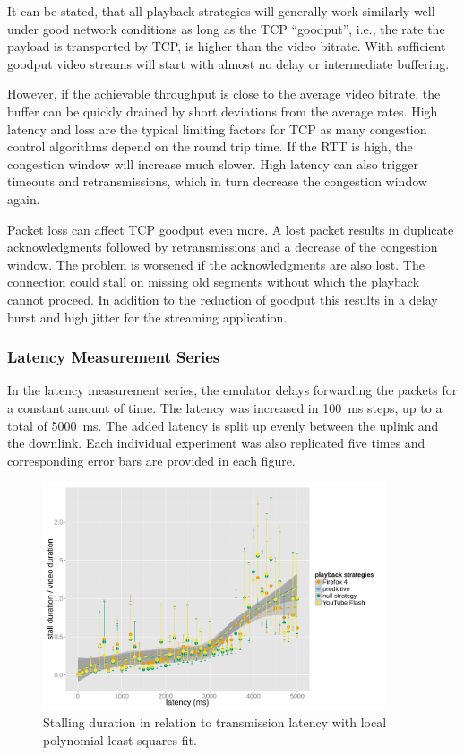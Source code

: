It can be stated, that all playback strategies will generally work similarly well under good network conditions as long as the \gls{TCP} ``goodput'', i.e., the rate the payload is transported by \gls{TCP}, is higher than the video bitrate. With sufficient goodput video streams will start with almost no delay or intermediate buffering. 

However, if the achievable throughput is close to the average video bitrate, the buffer can be quickly drained by short deviations from the average rates. High latency and loss are the typical limiting factors for \gls{TCP} as many congestion control algorithms depend on the round trip time. If the \gls{RTT} is high, the congestion window will increase much slower. High latency can also trigger  timeouts and retransmissions, which in turn decrease the congestion window again. 

Packet loss can affect \gls{TCP} goodput even more. A lost packet results in duplicate acknowledgments followed by retransmissions and a decrease of the congestion window. The problem is worsened if the acknowledgments are also lost. The connection could stall on missing old segments without which the playback cannot proceed. In addition to the reduction of goodput this results in a delay burst and high jitter for the streaming application.


\subsubsection{Latency Measurement Series}

In the latency measurement series, the emulator delays forwarding the packets for a constant amount of time. The latency was increased in \SI{100}{\milli\second} steps, up to a total of \SI{5000}{\milli\second}. The added latency is split up evenly between the uplink and the downlink. Each individual experiment was also replicated five times and corresponding error bars are provided in each figure.

\begin{figure}[htb]
	\centering
	\includegraphics[width=0.9\textwidth]{images/R-playbackemulation-stallduration-latency.pdf}
	\caption{Stalling duration in relation to transmission latency with local polynomial least-squares fit.}
\label{c3:fig:eval-latency-stallingtime}
\end{figure}

